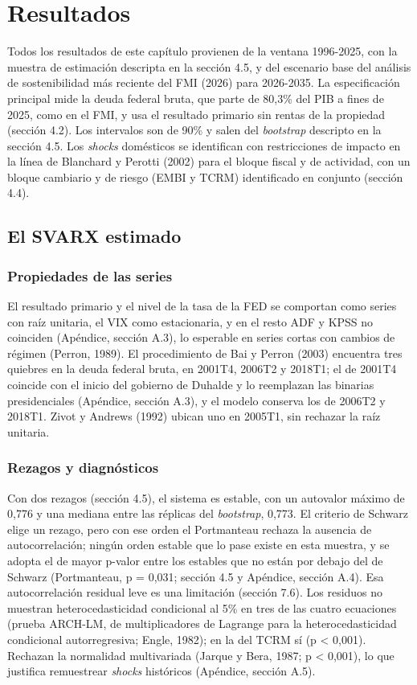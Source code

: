 \chapter{Resultados}

Todos los resultados de este capítulo provienen de la ventana 1996-2025,
con la muestra de estimación descripta en la sección 4.5, y del
escenario base del análisis de sostenibilidad más reciente del FMI
(2026) para 2026-2035. La especificación principal mide la deuda federal
bruta, que parte de 80,3\% del PIB a fines de 2025, como en el FMI, y
usa el resultado primario sin rentas de la propiedad (sección 4.2). Los
intervalos son de 90\% y salen del \emph{bootstrap} descripto en la
sección 4.5. Los \emph{shocks} domésticos se identifican con
restricciones de impacto en la línea de Blanchard y Perotti (2002) para
el bloque fiscal y de actividad, con un bloque cambiario y de riesgo
(EMBI y TCRM) identificado en conjunto (sección 4.4).

\section{El SVARX estimado}

\subsection{Propiedades de las series}

El resultado primario y el nivel de la tasa de la FED se comportan como
series con raíz unitaria, el VIX como estacionaria, y en el resto ADF y
KPSS no coinciden (Apéndice, sección A.3), lo esperable en series cortas
con cambios de régimen (Perron, 1989). El procedimiento de Bai y Perron
(2003) encuentra tres quiebres en la deuda federal bruta, en 2001T4,
2006T2 y 2018T1; el de 2001T4 coincide con el inicio del gobierno de
Duhalde y lo reemplazan las binarias presidenciales (Apéndice, sección
A.3), y el modelo conserva los de 2006T2 y 2018T1. Zivot y Andrews
(1992) ubican uno en 2005T1, sin rechazar la raíz unitaria.

\subsection{Rezagos y diagnósticos}

Con dos rezagos (sección 4.5), el sistema es estable, con un autovalor
máximo de 0,776 y una mediana entre las réplicas del \emph{bootstrap},
0,773. El criterio de Schwarz elige un rezago, pero con ese orden el
Portmanteau rechaza la ausencia de autocorrelación; ningún orden estable
que lo pase existe en esta muestra, y se adopta el de mayor p-valor
entre los estables que no están por debajo del de Schwarz (Portmanteau,
p = 0,031; sección 4.5 y Apéndice, sección A.4). Esa autocorrelación
residual leve es una limitación (sección 7.6). Los residuos no muestran
heterocedasticidad condicional al 5\% en tres de las cuatro ecuaciones
(prueba ARCH-LM, de multiplicadores de Lagrange para la
heterocedasticidad condicional autorregresiva; Engle, 1982); en la del
TCRM sí (p \textless{} 0,001). Rechazan la normalidad multivariada
(Jarque y Bera, 1987; p \textless{} 0,001), lo que justifica remuestrear
\emph{shocks} históricos (Apéndice, sección A.5).

